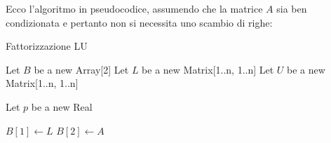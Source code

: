 Ecco l'algoritmo in pseudocodice, assumendo che la matrice $A$ sia ben condizionata e pertanto non si necessita uno scambio di righe:

\begin{algorithm}[H]
    \caption{Fattorizzazione LU}
    
        Let $B$ be a new Array[2]\;
        Let $L$ be a new Matrix[1..n, 1..n]\;
        Let $U$ be a new Matrix[1..n, 1..n]\;
    
        Let $p$ be a new Real
    
        $B[1] \gets L$\;
        $B[2] \gets A$\;
        \;
    \end{algorithm}

